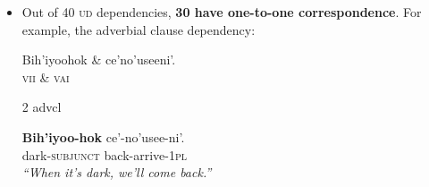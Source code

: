 \documentclass[portrait,a0paper,fontscale=0.36]{baposter} %
\newcommand{\compresslist}{ %
\setlength{\itemsep}{1pt}
\setlength{\parskip}{0pt}
\setlength{\parsep}{0pt}
}
\begin{document}
\begin{poster}
{
\begin{itemize} \compresslist
\item Out of 40 \textsc{ud} dependencies, \textbf{30 have one-to-one correspondence}. For example, the adverbial clause dependency:
\footnotesize
\begin{exe}
\ex \label{advcl} %
\begin{dependency}
\begin{deptext}
Bih'iyoohok \& ce'no'useeni'.\\
\textsc{vii} \& \textsc{vai}\\
\end{deptext}
	{2}	{advcl}
\end{dependency}
\gll \textbf{Bih'iyoo-hok} ce'-no'usee-ni'.\\
{dark-\textsc{subjunct}} {back-arrive-\textsc{1pl}}\\
\trans \textit{``When it's dark, we'll come back.''}
\end{exe}


\end{itemize}}
\end{poster}
\end{document}
